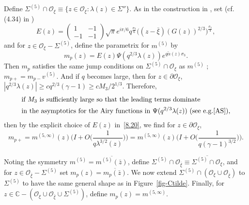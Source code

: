 \documentclass{amsart}
\theoremstyle{definition}
\theoremstyle{remark}
\numberwithin{equation}{section}
\newcommand{\C}{\mathbb C}
\newcommand{\wt}{\widetilde}
\begin{document}
Define $\Sigma^{(5)}\cap\mathcal{O}_{\xi}\equiv 
\{ z\in\mathcal{O}_{\xi} : \lambda(z)\in\Sigma''\}$.
As in the construction in \cite{DZ}, set (cf. (4.34) in \cite{DZ}) 
\begin{equation}\label{8.20}
   E(z) =\begin{pmatrix}1&-1\\-1&-1\end{pmatrix}
\sqrt\pi e^{i\pi/6}q^{\frac{\sigma_3}{6}}
\biggl((z-\bar\xi)(G(z))^{2/3}\biggr)^{\frac{\sigma_3}{4}}, 
\end{equation}
and for $z\in\mathcal{O}_{\xi}-\Sigma^{(5)}$, define the parametrix 
for $m^{(5)}$ by  
\begin{equation}
    m_p(z)=E(z)\Psi(q^{2/3}\lambda(z))e^{q\wt{\alpha}(z)\sigma_3}.
\end{equation}
Then $m_p$ satisfies the same jump conditions 
on $\Sigma^{(5)}\cap\mathcal{O}_{\xi}$ as $m^{(5)}$ ; $m_{p+}=m_{p-}v^{(5)}$.
And if $q$ becomes large, then 
for $z\in\partial\mathcal{O}_{\xi}$,
$|q^{2/3}\lambda(z)|\geq cq^{2/3}(\gamma-1) 
\geq cM_3/2^{1/3}$.
Therefore, 
\begin{equation}\label{e-z29}
 \begin{split}
  &\text{if $M_3$ is sufficiently large so that the leading terms dominate}\\ 
  &\text{in the asymptotics for the Airy functions in $\Psi(q^{2/3}\lambda(z))$ 
(see e.g.\cite{AS}),}
 \end{split}
\end{equation}
then by the explicit choice of $E(z)$ in~\eqref{8.20}, we find 
for $z\in\partial\mathcal{O}_{\xi}$, 
\begin{equation}\label{e-z27}
  m_{p+}=m^{(5,\infty)}(z)\biggl(I+O\bigl(\frac1{q\lambda^{3/2}(z)}\bigr)\biggr)
=m^{(5,\infty)}(z)\biggl(I+O\bigl(\frac1{q(\gamma-1)^{3/2}}\bigr)\biggr). 
\end{equation}

Noting the symmetry $m^{(5)}=\overline{m^{(5)}(\bar{z})}$, 
define $\Sigma^{(5)}\cap\mathcal{O}_{\bar{\xi}}\equiv 
\overline{\Sigma^{(5)}\cap\mathcal{O}_{\xi}}$, and 
for $z\in\mathcal{O}_{\bar{\xi}}-\Sigma^{(5)}$ 
set $m_p(z)=\overline{m_p(\bar{z})}$.
We now extend $\Sigma^{(5)}\cap(\mathcal{O}_{\xi}\cup\mathcal{O}_{\bar{\xi}})$ 
to $\Sigma^{(5)}$ to have the same general shape as in Figure~\ref{fig-Ctilde}. 
Finally, for $z\in\C-({\mathcal{O}}_\xi 
\cup {\mathcal{O}}_{\bar{\xi}} \cup\Sigma^{(5)})$, 
define $m_p(z)=m^{(5,\infty)}$.
\end{document}

